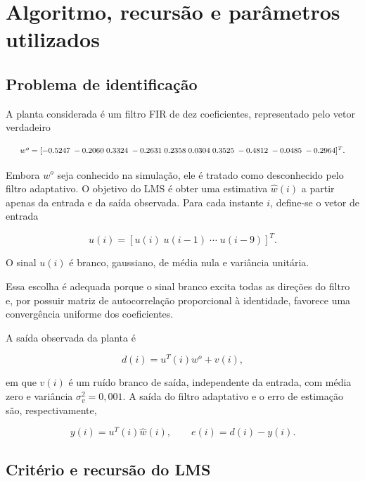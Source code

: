 \documentclass[11pt,a4paper,oneside]{report}
\newcommand{\wtrue}{w^{o}}
\newcommand{\what}{\widehat{w}}
\begin{document}
\section{Algoritmo, recursão e parâmetros utilizados}

\subsection{Problema de identificação}

A planta considerada é um filtro FIR de dez coeficientes, representado pelo vetor verdadeiro

\begin{equation}
\resizebox{0.96\textwidth}{!}{$
\wtrue=
[-0.5247\; -0.2060\; 0.3324\; -0.2631\; 0.2358\; 0.0304\; 0.3525\; -0.4812\; -0.0485\; -0.2964]^T.
$}
\end{equation}

Embora \(\wtrue\) seja conhecido na simulação, ele é tratado como desconhecido pelo filtro adaptativo.
O objetivo do LMS é obter uma estimativa \(\what(i)\) a partir apenas da entrada e da saída observada.
Para cada instante \(i\), define-se o vetor de entrada

\begin{equation}
    {u}(i)=[u(i)\;u(i-1)\;\cdots\;u(i-9)]^T.
\end{equation}

O sinal \(u(i)\) é branco, gaussiano, de média nula e variância unitária.

Essa escolha é adequada porque o sinal branco excita todas as direções do filtro e, por possuir matriz
de autocorrelação proporcional à identidade, favorece uma convergência uniforme dos coeficientes.

A saída observada da planta é

\begin{equation}
    d(i)={u}^T(i)\wtrue+v(i),
\end{equation}

em que \(v(i)\) é um ruído branco de saída, independente da entrada, com média zero e variância
\(\sigma_v^2=0{,}001\). A saída do filtro adaptativo e o erro de estimação são, respectivamente,

\begin{equation}
    y(i)={u}^T(i)\what(i),
    \qquad
    e(i)=d(i)-y(i).
\end{equation}

\subsection{Critério e recursão do LMS}
\end{document}

